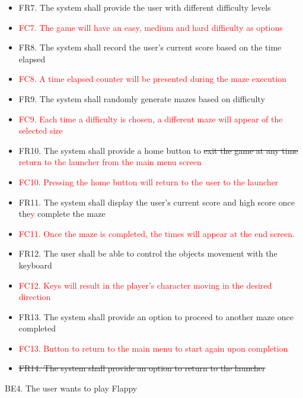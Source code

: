 \documentclass[12pt, titlepage]{article}
\begin{document}
    \begin{itemize}
        \item FR7. The system shall provide the user with different difficulty levels
        \item \textcolor{red}{FC7. The game will have an easy, medium and hard difficulty as options}
        \item FR8. The system shall record the user’s current score based on the time elapsed
        \item \textcolor{red}{FC8. A time elapsed counter will be presented during the maze execution}
        \item FR9. The system shall randomly generate mazes based on difficulty
        \item \textcolor{red}{FC9. Each time a difficulty is chosen, a different maze will appear of the selected size}
        \item FR10. The system shall provide a home button to \sout{exit the game at any time} \textcolor{red}{return to the launcher from the main menu screen}
        \item \textcolor{red}{FC10. Pressing the home button will return to the user to the launcher}
        \item FR11. The system shall display the user’s current score and high score once the\textcolor{red}{y} complete the maze
        \item \textcolor{red}{FC11. Once the maze is completed, the times will appear at the end screen.}
        \item FR12. The user shall be able to control the objects movement with the keyboard
        \item \textcolor{red}{FC12. Keys will result in the player's character moving in the desired direction}
        \item FR13. The system shall provide an option to proceed to another maze once completed
        \item \textcolor{red}{FC13. Button to return to the main menu to start again upon completion}
        \item \sout{FR14. The system shall provide an option to return to the launcher}
    \end{itemize}
    BE4. The user wants to play Flappy
\end{document}
